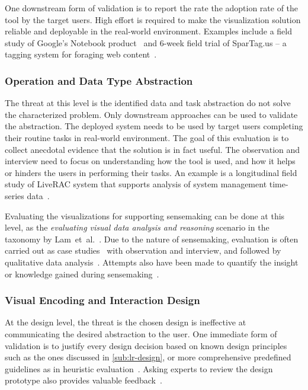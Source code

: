 One downstream form of validation is to report the rate the adoption rate of the tool by the target users. High effort is required to make the visualization solution reliable and deployable in the real-world environment. Examples include a field study of Google's Notebook product~\cite{Russell2008} and 6-week field trial of SparTag.us -- a tagging system for foraging web content~\cite{Hong2008}.

\subsubsection{Operation and Data Type Abstraction}
The threat at this level is the identified data and task abstraction do not solve the characterized problem. Only downstream approaches can be used to validate the abstraction. The deployed system needs to be used by target users completing their routine tasks in real-world environment. The goal of this evaluation is to collect anecdotal evidence that the solution is in fact useful. The observation and interview need to focus on understanding how the tool is used, and how it helps or hinders the users in performing their tasks. An example is a longitudinal field study of LiveRAC system that supports analysis of system management time-series data~\cite{McLachlan2008}.

Evaluating the visualizations for supporting sensemaking can be done at this level, as the \emph{evaluating visual data analysis and reasoning} scenario in the taxonomy by Lam~et~al.~\cite{Lam2012}. Due to the nature of sensemaking, evaluation is often carried out as case studies~\cite{Kang2011} with observation and interview, and followed by qualitative data analysis~\cite{Lazar2010}. Attempts also have been made to quantify the insight or knowledge gained during sensemaking~\cite{Wilson2013}.

\subsubsection{Visual Encoding and Interaction Design}
At the design level, the threat is the chosen design is ineffective at communicating the desired abstraction to the user. One immediate form of validation is to justify every design decision based on known design principles such as the ones discussed in \autoref{sub:lr-design}, or more comprehensive predefined guidelines as in heuristic evaluation~\cite{Zuk2006}. Asking experts to review the design prototype also provides valuable feedback~\cite{Tory2005}.


